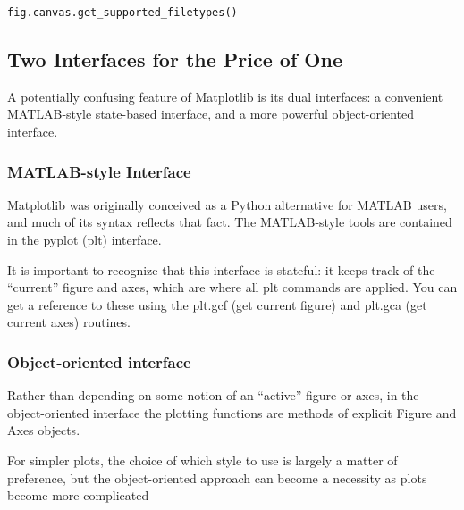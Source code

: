 \verb|fig.canvas.get_supported_filetypes()|

\subsection*{Two Interfaces for the Price of One}
A potentially confusing feature of Matplotlib is its dual interfaces: a convenient
MATLAB-style state-based interface, and a more powerful object-oriented interface.

\subsubsection*{MATLAB-style Interface}
Matplotlib was originally conceived as a Python alternative for MATLAB users, and
much of its syntax reflects that fact. The MATLAB-style tools are contained in the
pyplot (plt) interface.

It is important to recognize that this interface is stateful: it keeps track of the “current”
figure and axes, which are where all plt commands are applied. You can get a reference to these using the plt.gcf (get current figure) and plt.gca (get current axes)
routines.


\subsubsection*{Object-oriented interface}
Rather than depending on some
notion of an “active” figure or axes, in the object-oriented interface the plotting functions are methods of explicit Figure and Axes objects.

For simpler plots, the choice of which style to use is largely a matter of preference, but
the object-oriented approach can become a necessity as plots become more complicated